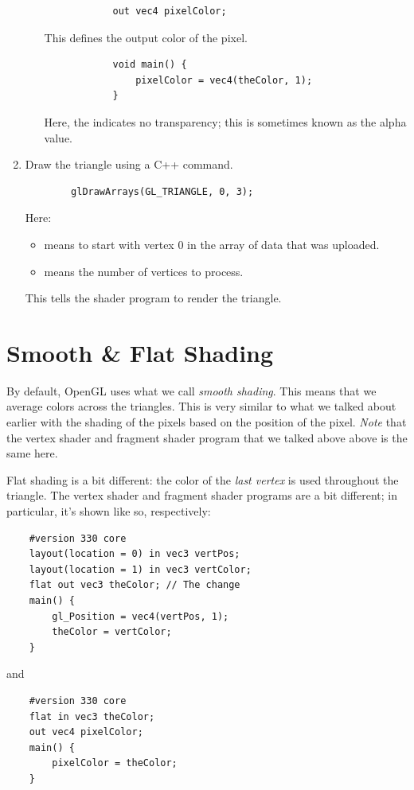 \documentclass[letterpaper]{article}
\begin{document}
\begin{enumerate}
\begin{itemize}
        \begin{verbatim}
            out vec4 pixelColor;\end{verbatim}
        This defines the output color of the pixel. 

        \begin{verbatim}
            void main() {
                pixelColor = vec4(theColor, 1);
            }\end{verbatim}
        Here, the  indicates no transparency; this is sometimes known as the alpha value. 
    \end{itemize}
    

    \item Draw the triangle using a C++ command. 
    \begin{verbatim}
        glDrawArrays(GL_TRIANGLE, 0, 3);\end{verbatim}
    Here: 
    \begin{itemize}
        \item {} means to start with vertex 0 in the array of data that was uploaded. 
        \item {} means the number of vertices to process. 
    \end{itemize}
    This tells the shader program to render the triangle.  
\end{enumerate}

\section{Smooth \& Flat Shading}
By default, OpenGL uses what we call \emph{smooth shading}. This means that we average colors across the triangles. This is very similar to what we talked about earlier with the shading of the pixels based on the position of the pixel. \emph{Note} that the vertex shader and fragment shader program that we talked above above is the same here. 

\bigskip 

Flat shading is a bit different: the color of the \emph{last vertex} is used throughout the triangle. The vertex shader and fragment shader programs are a bit different; in particular, it's shown like so, respectively: 
\begin{verbatim}
    #version 330 core 
    layout(location = 0) in vec3 vertPos; 
    layout(location = 1) in vec3 vertColor;
    flat out vec3 theColor; // The change 
    main() {
        gl_Position = vec4(vertPos, 1);
        theColor = vertColor;
    }
\end{verbatim}
and 
\begin{verbatim}
    #version 330 core 
    flat in vec3 theColor; 
    out vec4 pixelColor; 
    main() {
        pixelColor = theColor; 
    }
\end{verbatim}
\end{document}
